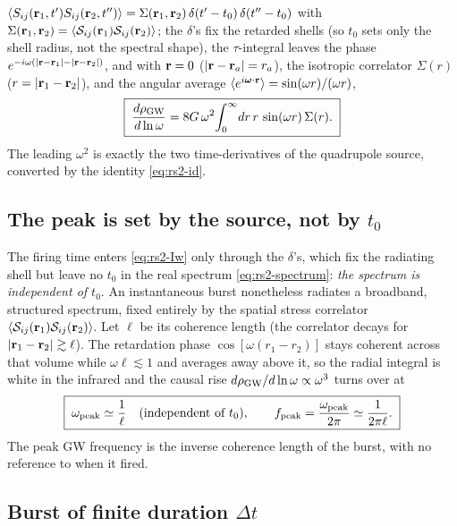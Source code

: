 \documentclass[10pt,prd,aps,nobibnotes,superscriptaddress,preprintnumbers,notitlepage]{revtex4-1}
\newcommand{\br}{{\bf r}}
\begin{document}
$\langle S_{ij}(\br_1,t')S_{ij}(\br_2,t'')\rangle=\Sigma(\br_1,\br_2)\,\delta(t'-t_0)\,\delta(t''-t_0)$
with $\Sigma(\br_1,\br_2)=\langle\mathcal{S}_{ij}(\br_1)\mathcal{S}_{ij}(\br_2)\rangle$;
the $\delta$'s fix the retarded shells (so $t_0$ sets only the shell radius, not the
spectral shape), the $\tau$-integral leaves the phase
$e^{-i\omega(|\br-\br_1|-|\br-\br_2|)}$, and with $\br=0$ ($|\br-\br_a|=r_a$), the
isotropic correlator $\Sigma(r)$ ($r=|\br_1-\br_2|$), and the angular average
$\langle e^{i\boldsymbol{\omega}\cdot\br}\rangle=\sin(\omega r)/(\omega r)$,
\begin{equation}
  \boxed{\;
  \frac{d\rho_{\rm GW}}{d\ln\omega}
  =8G\,\omega^2\!\int_0^\infty\!dr\,r\,\sin(\omega r)\,\Sigma(r).\;}
  \label{eq:rs2-spectrum}
\end{equation}
The leading $\omega^2$ is exactly the two time-derivatives of the quadrupole source,
converted by the identity \eqref{eq:rs2-id}.

\subsection{The peak is set by the source, not by \texorpdfstring{$t_0$}{t0}}
\label{sec:rs2-peak}

The firing time enters \eqref{eq:rs2-Iw} only through the $\delta$'s, which fix the
radiating shell but leave no $t_0$ in the real spectrum \eqref{eq:rs2-spectrum}:
\emph{the spectrum is independent of $t_0$}. An instantaneous burst nonetheless radiates a broadband, structured spectrum,
fixed entirely by the spatial stress correlator
$\langle\mathcal{S}_{ij}(\br_1)\mathcal{S}_{ij}(\br_2)\rangle$. Let $\ell$ be its
coherence length (the correlator decays for $|\br_1-\br_2|\gtrsim\ell$). The
retardation phase $\cos[\omega(r_1-r_2)]$ stays coherent across that volume while
$\omega\ell\lesssim1$ and averages away above it, so the radial integral is white in
the infrared and the causal rise $d\rho_{\rm GW}/d\ln\omega\propto\omega^3$ turns over
at
\begin{equation}
  \boxed{\;
  \omega_{\rm peak}\simeq\frac{1}{\ell}
  \quad(\text{independent of }t_0),
  \qquad f_{\rm peak}=\frac{\omega_{\rm peak}}{2\pi}\simeq\frac{1}{2\pi\ell}.\;}
  \label{eq:rs2-fpeak}
\end{equation}
The peak GW frequency is the inverse coherence length of the burst, with no reference
to when it fired.

\subsection{Burst of finite duration \texorpdfstring{$\Delta t$}{Dt}}
\label{sec:burst}
\label{sec:rs2-duration}
\end{document}
